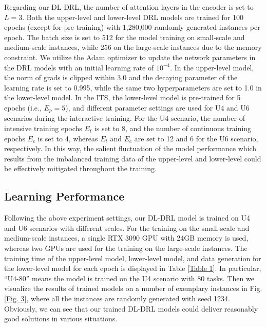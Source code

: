 \documentclass[lettersize,journal]{IEEEtran}
\begin{document}
	
	Regarding our DL-DRL, the number of attention layers in the encoder is set to $L=3$. Both the upper-level and lower-level DRL models are trained for 100 epochs (except  for pre-training) with 1,280,000 randomly generated instances per epoch. The batch size is set to 512 for the model training on small-scale and medium-scale instances, while 256 on the large-scale instances due to the memory constraint. We utilize the Adam optimizer to update the network parameters in the DRL models with an initial learning rate of $10^{-4}$. In the upper-level model, the norm of grads is clipped within 3.0 and the decaying parameter of the learning rate is set to 0.995, while the same two hyperparameters are set to 1.0 in the lower-level model. In the ITS, the lower-level model is pre-trained for 5 epochs (i.e., ${{E}_{p}}=5$), and different parameter settings are used for U4 and U6 scenarios during the interactive training. For the U4 scenario, the number of intensive training epochs ${{E}_{t}}$ is set to 8, and the number of continuous training epochs ${{E}_{c}}$ is set to 4, whereas ${{E}_{t}}$ and ${{E}_{c}}$ are set to 12 and 6 for the U6 scenario, respectively. In this way, the salient fluctuation of the model performance which results from the imbalanced training data of the upper-level and lower-level could be effectively mitigated throughout the training.
	
	
	\subsection{Learning Performance}
	
	Following the above experiment settings, our DL-DRL model is trained on U4 and U6 scenarios with different scales. For the training on the small-scale and medium-scale instances, a single RTX 3090 GPU with 24GB memory is used, whereas two GPUs are used for the training on the large-scale instances. The training time of the upper-level model, lower-level model, and data generation for the lower-level model for each epoch is displayed in Table \ref{Table 1}. In particular, “U4-80” means the model is trained on the U4 scenario with 80 tasks. Then we visualize the results of trained models on a number of exemplary instances in Fig. \ref{Fig. 3}, where all the instances are randomly generated with seed 1234. Obviously, we can see that our trained DL-DRL models could deliver reasonably good solutions in various situations.
	
\end{document}
